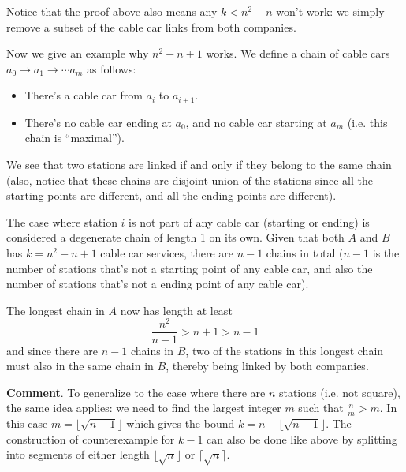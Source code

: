 \documentclass[11pt,a4paper]{article}
\begin{document}
\begin{enumerate}
	Notice that the proof above also means any $k<n^2-n$ won't work: we simply remove a subset of the cable car links from both companies. 
	
	Now we give an example why $n^2-n+1$ works. 
	We define a chain of cable cars $a_0\to a_1\to\cdots a_m$ as follows: 
	\begin{itemize}
		\item There's a cable car from $a_i$ to $a_{i+1}$. 
		\item There's no cable car ending at $a_0$, and no cable car starting at $a_m$ (i.e. this chain is ``maximal''). 
	\end{itemize}
	We see that two stations are linked if and only if they belong to the same chain (also, notice that these chains are disjoint union of the stations since all the starting points are different, and all the ending points are different). 
	
	The case where station $i$ is not part of any cable car (starting or ending) is considered a degenerate chain of length 1 on its own. Given that both $A$ and $B$ has $k=n^2-n+1$ cable car services, there are $n-1$ chains in total ($n-1$ is the number of stations that's not a starting point of any cable car, and also the number of stations that's not a ending point of any cable car). 
	
	The longest chain in $A$ now has length at least
	\[
	\frac{n^2}{n-1}>n+1>n-1
	\]
	and since there are $n-1$ chains in $B$, two of the stations in this longest chain must also in the same chain in $B$, thereby being linked by both companies. 
	
	\textbf{Comment}. To generalize to the case where there are $n$ stations (i.e. not square), the same idea applies: we need to find the largest integer $m$ such that $\frac{n}{m}>m$. In this case $m=\lfloor\sqrt{n-1}\rfloor$ which gives the bound $k=n-\lfloor\sqrt{n-1}\rfloor$. The construction of counterexample for $k-1$ can also be done like above by splitting into segments of either length $\lfloor\sqrt{n}\rfloor$ or $\lceil\sqrt{n}\rceil$. 
\end{enumerate}
\end{document}
